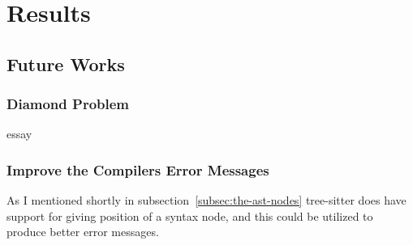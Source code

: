 \chapter{Results}\label{ch:results}

\section{Future Works}\label{sec:future-works}

\subsection{Diamond Problem}\label{subsec:diamond-problem}

essay

\subsection{Improve the Compilers Error Messages}\label{subsec:compiler-with-focus-on-error-messages}

As I mentioned shortly in subsection~\vref{subsec:the-ast-nodes} tree-sitter does have support for giving position of a syntax node, and this could be utilized to produce better error messages.
